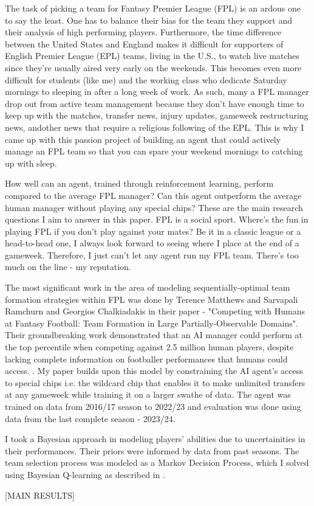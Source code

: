 The task of picking a team for Fantasy Premier League (FPL) is an ardous one to say the least. One has to balance their bias for 
the team they support and their analysis of high performing players. Furthermore, the time difference between the United States and England makes 
it difficult for supporters of English Premier League (EPL) teams, living in the U.S., to watch live matches since they're usually aired very early on the weekends. This becomes 
even more difficult for students (like me) and the working class who dedicate Saturday mornings to sleeping in after a long week of work. As such, many a FPL manager 
drop out from active team management because they don't have enough time to keep up with the matches, transfer news, injury updates, gameweek restructuring news, andother news that require a religious following of the EPL. This is why I came up with this passion project of building an agent that could actively manage an FPL team so that you can spare your weekend mornings to catching up with sleep.

How well can an agent, trained through reinforcement learning, perform compared to the average FPL manager? Can this agent outperform the average human manager without playing any special chips? These are the main research questions I aim to answer in this paper. FPL is a social sport. Where's the fun in playing FPL if you don't play against your mates? 
Be it in a classic league or a head-to-head one, I always look forward to seeing where I place at the end of a gameweek. Therefore, I just can't let any agent run my FPL team. There's too much on the line - my reputation.

The most significant work in the area of modeling sequentially-optimal team formation strategies within FPL was done by Terence Matthews and Sarvapali Ramchurn and Georgios Chalkiadakis in their paper - "Competing with Humans at Fantasy Football: Team Formation in Large Partially-Observable Domains". Their groundbreaking work demonstrated that an AI manager could perform at the top percentile when competing against 2.5 million human players, despite lacking complete information on footballer performances that humans could access. \cite{matthews2012}. My paper builds upon this model by constraining the AI agent's access to special chips i.e. the wildcard chip that enables it to make unlimited transfers at any gameweek while training it on a larger swathe of data. The agent was trained on data from 2016/17 season to 2022/23 and evaluation was done using data from the last complete season - 2023/24.

I took a Bayesian approach in modeling players' abilities due to uncertainities in their performances. Their priors were informed by data from past seasons. The team selection process was modeled as a Markov Decision Process, which I solved using Bayesian Q-learning as described in \cite{matthews2012}.

[MAIN RESULTS]